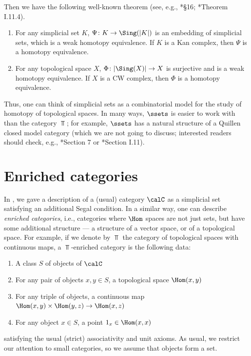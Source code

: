 Then we have the following well-known theorem (see, e.g., *{\S 16};
*{Theorem I.11.4}).

\begin{theorem} \label{t:sset-top}
\par\noindent
  \begin{enumerate}
    \item For any simplicial set $K$, $\Psi\colon K\to \Sing(|K|)$ is an
      embedding of simplicial sets, which is a weak homotopy equivalence.
      If $K$ is a Kan complex, then $\Psi$ is a homotopy equivalence.
    \item
      For any topological space $X$, $\Phi\colon |\Sing(X)|\to X$ is surjective
      and is a weak homotopy equivalence. If $X$ is a CW complex, then $\Phi$
      is a homotopy equivalence.
  \end{enumerate}
\end{theorem}

Thus, one can think of simplicial sets as a combinatorial model for the study of
homotopy of topological spaces. In many ways, $\ssets$ is easier to work with
than the category $\Top$; for example, $\ssets$ has a natural structure of a
Quillen closed model category (which we are not going to discuss; interested
readers should check, e.g., *{Section 7} or
*{Section I.11}).



\section{Enriched categories}\label{s:enriched-cat}

In , we gave a description of a (usual) category $\calC$
as a simplicial set satisfying an additional Segal condition. In a similar way,
one can describe \emph{enriched categories}, i.e., categories where $\Hom$
spaces are not just sets, but have some additional structure --- a structure of
a vector space, or of a topological space. For example, if we denote by $\Top$
the category of topological spaces with continuous maps, a $\Top$-enriched
category is the following data:
\begin{enumerate}
\item A class $S$ of objects of $\calC$
\item For any pair of objects $x,y\in S$, a topological space
  $\Hom(x,y)$
\item For any triple of objects, a continuous map
      $\Hom(x,y)\times \Hom(y,z)\to \Hom(x,z)$
\item For any object $x\in S$, a point $1_x\in \Hom(x,x)$
\end{enumerate}
satisfying the usual (strict) associativity and unit axioms. As usual, we
restrict our attention to small categories, so we assume that objects form a
set.

